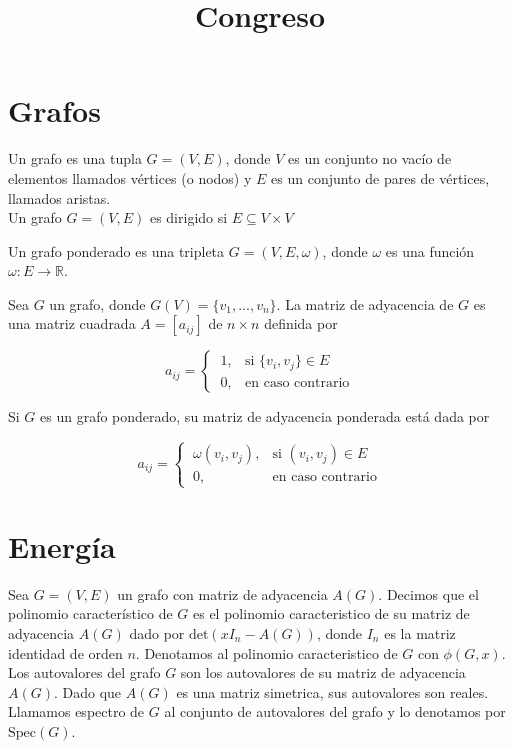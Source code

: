 \documentclass{article}
\title{Congreso}
\author{ }
\date{}
\begin{document}
\maketitle

\section{Grafos}

Un grafo es una tupla $G = (V, E)$, donde $V$ es un conjunto no vacío de elementos llamados vértices (o nodos) y $E$ es un conjunto de pares de vértices, llamados aristas.\\

Un grafo $G = (V, E)$ es dirigido si $E \subseteq V \times V$

Un grafo ponderado es una tripleta $G = (V, E, \omega)$, donde $\omega$ es una función $\omega: E \rightarrow \mathbb{R}$.

Sea $G$ un grafo, donde $G(V) = \lbrace v_1, ..., v_n \rbrace$. La matriz de adyacencia de $G$ es una matriz cuadrada $A = [a_{ij}]$ de $n \times n$ definida por

\[
a_{ij} =
\begin{cases} 
\ 1, & \text{si } \lbrace v_i , v_j\rbrace \in E \\
\ 0, & \text{en caso contrario}
\end{cases}
\]

Si $G$ es un grafo ponderado, su matriz de adyacencia ponderada está dada por

\[
a_{ij} =
\begin{cases} 
\ \omega( v_i , v_j), & \text{si } (v_i , v_j) \in E \\
\ 0, & \text{en caso contrario}
\end{cases}
\]

\section{Energía}

Sea $G = (V, E)$ un grafo con matriz de adyacencia $A(G)$. Decimos que el polinomio característico de $G$ es el polinomio caracteristico de su matriz de adyacencia $A(G)$ dado por $\text{det}(xI_n-A(G))$, donde $I_n$ es la matriz identidad de orden $n$. Denotamos al polinomio caracteristico de $G$ con $\phi(G, x)$. Los autovalores del grafo $G$ son los autovalores de su matriz de adyacencia $A(G)$. Dado que $A(G)$ es una matriz simetrica, sus autovalores son reales. Llamamos espectro de $G$ al conjunto de autovalores del grafo y lo denotamos por $\text{Spec}(G)$. 
\end{document}
